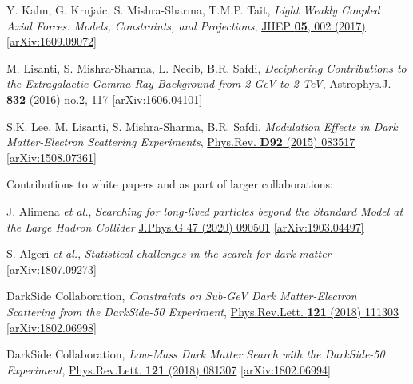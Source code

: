 \documentclass[11pt]{article}
\newenvironment{packed_enumerate}[1][]{
\begin{etaremune}[#1]
  \setlength{\itemsep}{3pt}
  \setlength{\parskip}{0pt}
  \setlength{\parsep}{0pt}}{\end{etaremune}
}
\begin{document}
\begin{packed_enumerate}[start=24]
  \item Y. Kahn, G. Krnjaic, S. Mishra-Sharma, T.M.P. Tait, \emph{Light Weakly Coupled Axial Forces: Models, Constraints, and Projections},  \href{https://link.springer.com/article/10.1007%2FJHEP05%282017%29002}{JHEP \textbf{05}, 002 (2017)}  \href{https://arxiv.org/abs/1609.09072}{[arXiv:1609.09072]}

  \item M. Lisanti, S. Mishra-Sharma, L. Necib, B.R. Safdi, \emph{Deciphering Contributions to the Extragalactic Gamma-Ray Background from 2 GeV to 2 TeV},  \href{http://iopscience.iop.org/article/10.3847/0004-637X/832/2/117/meta}{Astrophys.J. \textbf{832} (2016) no.2, 117} \href{https://arxiv.org/abs/1606.04101}{[arXiv:1606.04101]}

  \item S.K. Lee, M. Lisanti, S. Mishra-Sharma, B.R. Safdi, \emph{Modulation Effects in Dark Matter-Electron Scattering Experiments}, \href{https://journals.aps.org/prd/abstract/10.1103/PhysRevD.92.083517}{Phys.Rev. \textbf{D92} (2015) 083517} \href{https://arxiv.org/abs/1508.07361}{[arXiv:1508.07361]}
\end{packed_enumerate}

\noindent
Contributions to white papers and as part of larger collaborations:

\begin{packed_enumerate}[start=4]
  \item J. Alimena \emph{et al.}, \emph{Searching for long-lived particles beyond the Standard Model at the Large Hadron Collider}  \href{https://iopscience.iop.org/article/10.1088/1361-6471/ab4574}{J.Phys.G 47 (2020) 090501} \href{https://arxiv.org/abs/1903.04497}{[arXiv:1903.04497]}

  \item S. Algeri \emph{et al.}, \emph{Statistical challenges in the search for dark matter} \href{https://arxiv.org/abs/1807.09273}{[arXiv:1807.09273]}

  \item DarkSide Collaboration, \emph{Constraints on Sub-GeV Dark Matter-Electron Scattering from the DarkSide-50 Experiment}, \href{https://journals.aps.org/prl/abstract/10.1103/PhysRevLett.121.111303}{Phys.Rev.Lett. \textbf{121} (2018) 111303} \href{https://arxiv.org/abs/1802.06998}{[arXiv:1802.06998]}

  \item DarkSide Collaboration, \emph{Low-Mass Dark Matter Search with the DarkSide-50 Experiment}, \href{https://journals.aps.org/prl/abstract/10.1103/PhysRevLett.121.081307}{Phys.Rev.Lett. \textbf{121} (2018) 081307}  \href{https://arxiv.org/abs/1802.06994}{[arXiv:1802.06994]}
\end{packed_enumerate}
\vspace{2.0mm}
\end{document}
